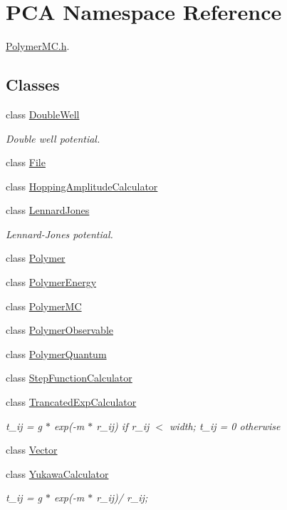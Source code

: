 \hypertarget{namespace_p_c_a}{}\section{P\+CA Namespace Reference}
\label{namespace_p_c_a}


\hyperlink{_polymer_m_c_8h}{Polymer\+M\+C.\+h}.  


\subsection*{Classes}
\begin{DoxyCompactItemize}
\item 
class \hyperlink{class_p_c_a_1_1_double_well}{Double\+Well}
\begin{DoxyCompactList}\small\item\em Double well potential. \end{DoxyCompactList}\item 
class \hyperlink{class_p_c_a_1_1_file}{File}
\item 
class \hyperlink{class_p_c_a_1_1_hopping_amplitude_calculator}{Hopping\+Amplitude\+Calculator}
\item 
class \hyperlink{class_p_c_a_1_1_lennard_jones}{Lennard\+Jones}
\begin{DoxyCompactList}\small\item\em Lennard-\/\+Jones potential. \end{DoxyCompactList}\item 
class \hyperlink{class_p_c_a_1_1_polymer}{Polymer}
\item 
class \hyperlink{class_p_c_a_1_1_polymer_energy}{Polymer\+Energy}
\item 
class \hyperlink{class_p_c_a_1_1_polymer_m_c}{Polymer\+MC}
\item 
class \hyperlink{class_p_c_a_1_1_polymer_observable}{Polymer\+Observable}
\item 
class \hyperlink{class_p_c_a_1_1_polymer_quantum}{Polymer\+Quantum}
\item 
class \hyperlink{class_p_c_a_1_1_step_function_calculator}{Step\+Function\+Calculator}
\item 
class \hyperlink{class_p_c_a_1_1_trancated_exp_calculator}{Trancated\+Exp\+Calculator}
\begin{DoxyCompactList}\small\item\em t\+\_\+ij = g $\ast$ exp(-\/m $\ast$ r\+\_\+ij) if r\+\_\+ij $<$ width; t\+\_\+ij = 0 otherwise \end{DoxyCompactList}\item 
class \hyperlink{class_p_c_a_1_1_vector}{Vector}
\item 
class \hyperlink{class_p_c_a_1_1_yukawa_calculator}{Yukawa\+Calculator}
\begin{DoxyCompactList}\small\item\em t\+\_\+ij = g $\ast$ exp(-\/m $\ast$ r\+\_\+ij)/ r\+\_\+ij; \end{DoxyCompactList}\end{DoxyCompactItemize}
